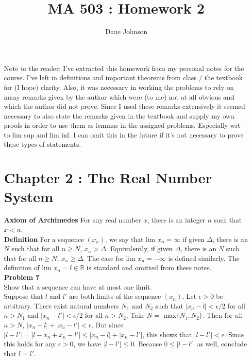\documentclass[a4paper]{article}
\title{MA 503 : Homework 2}
\author{Dane Johnson}
\begin{document}
\maketitle

Note to the reader: I've extracted this homework from my personal notes for the course. I've left in definitions and important theorems from class / the textbook for (I hope) clarity. Also, it was necessary in working the problems to rely on many remarks given by the author which were (to me) not at all obvious and which the author did not prove. Since I used these remarks extensively it seemed necessary to also state the remarks given in the textbook and supply my own proofs in order to use them as lemmas in the assigned problems. Especially wrt to lim sup and lim inf. I can omit this in the future if it's not necessary to prove these types of statements. 

\section*{Chapter 2 : The Real Number System}

{\bf Axiom of Archimedes} For any real number $x$, there is an integer $n$ such that $x<n$.\\

{\bf Definition} For a sequence $(x_n)$, we say that lim $x_n = \infty$ if given $\Delta$, there is an $N$ such that for all $n\geq N$, $x_n > \Delta$. Equivalently, if given $\Delta$, there is an $N$ such that for all $n\geq N$, $x_n \geq \Delta$. The case for lim $x_n = -\infty$ is defined similarly. The definition of lim $x_n = l \in \mathbb{R}$ is standard and omitted from these notes. \\

{\bf Problem 7}\\
Show that a sequence can have at most one limit.\\

Suppose that $l$ and $l'$ are both limits of the sequence $(x_n)$. Let $\epsilon > 0$ be arbitrary. There exist natural numbers $N_1$ and $N_2$ such that $|x_n -l| < \epsilon / 2$ for all $n > N_1$ and $|x_n - l'| < \epsilon / 2$ for all $n > N_2$. Take $N = $ max$\{N_1,N_2\}$. Then for all $n > N$, $|x_n - l| + |x_n - l'| < \epsilon$. But since $|l - l'| = |l - x_n + x_n - l'| \leq |x_n - l| + |x_n - l'|$, this shows that $|l-l'| < \epsilon$. Since this holds for any $\epsilon >0$, we have $|l - l'| \leq 0$. Because  $0\leq |l-l'|$ as well, conclude that $l =l'$. \\
\end{document}
